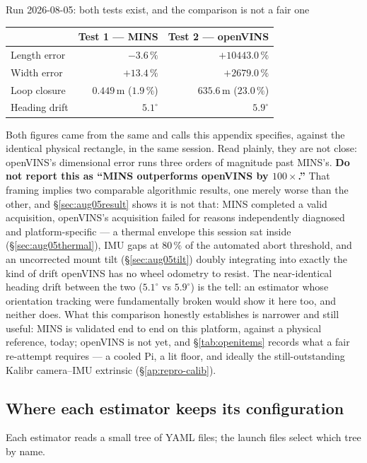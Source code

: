 \begin{casestudy}{Run 2026-08-05: both tests exist, and the comparison is not
a fair one}
\begin{center}
\begin{tabular}{lrr}
\toprule
& Test 1 --- MINS & Test 2 --- openVINS \\
\midrule
Length error   & $-3.6\,\%$  & $+10443.0\,\%$ \\
Width error    & $+13.4\,\%$ & $+2679.0\,\%$ \\
Loop closure   & $0.449$\,m ($1.9\,\%$) & $635.6$\,m ($23.0\,\%$) \\
Heading drift  & $5.1^\circ$ & $5.9^\circ$ \\
\bottomrule
\end{tabular}
\end{center}
Both figures came from the same  and
 calls this appendix specifies, against the
identical physical rectangle, in the same session. Read plainly, they are
not close: openVINS's dimensional error runs three orders of magnitude past
MINS's. \textbf{Do not report this as ``MINS outperforms openVINS by
$100\times$.''} That framing implies two comparable algorithmic results,
one merely worse than the other, and \S\ref{sec:aug05result} shows it is not
that: MINS completed a valid acquisition, openVINS's acquisition failed for
reasons independently diagnosed and platform-specific --- a thermal envelope
this session sat inside (\S\ref{sec:aug05thermal}), IMU gaps at $80\,\%$ of
the automated abort threshold, and an uncorrected mount tilt
(\S\ref{sec:aug05tilt}) doubly integrating into exactly the kind of drift
openVINS has no wheel odometry to resist. The near-identical heading drift
between the two ($5.1^\circ$ vs $5.9^\circ$) is the tell: an estimator whose
orientation tracking were fundamentally broken would show it here too, and
neither does. What this comparison honestly establishes is narrower and
still useful: MINS is validated end to end on this platform, against a
physical reference, today; openVINS is not yet, and \S\ref{tab:openitems}
records what a fair re-attempt requires --- a cooled Pi, a lit floor, and
ideally the still-outstanding Kalibr camera--IMU extrinsic
(\S\ref{ap:repro-calib}).
\end{casestudy}

\subsection{Where each estimator keeps its configuration}
\label{ap:repro-config-ref}
Each estimator reads a small tree of YAML files; the launch files select
which tree by name.

